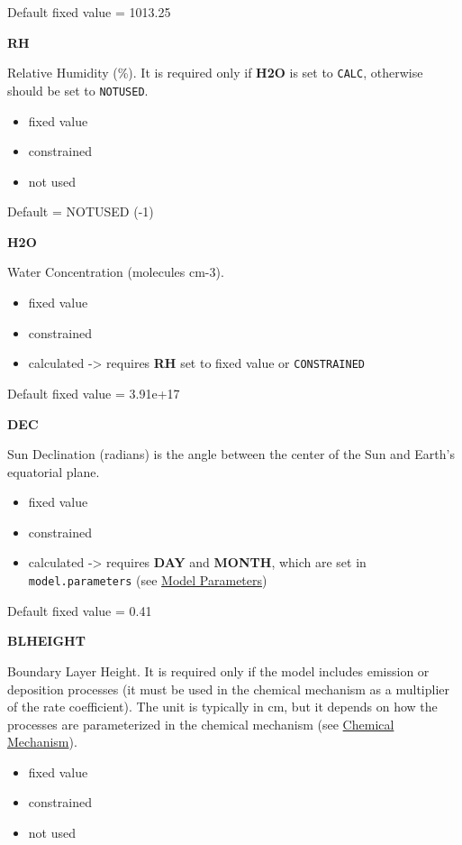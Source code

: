 Default fixed value = 1013.25

\textbf{RH}

Relative Humidity (\%). It is required only if \textbf{H2O} is set to
\texttt{CALC}, otherwise should be set to \texttt{NOTUSED}.

\begin{itemize}
\item fixed value
\item constrained
\item not used
\end{itemize}

Default = NOTUSED (-1)

\textbf{H2O}

Water Concentration (molecules cm-3).

\begin{itemize}
\item fixed value
\item constrained
\item calculated -\textgreater{} requires \textbf{RH} set to fixed
  value or \texttt{CONSTRAINED}
\end{itemize}

Default fixed value = 3.91e+17

\textbf{DEC}

Sun Declination (radians) is the angle between the center of the Sun
and Earth's equatorial plane.

\begin{itemize}
\item fixed value
\item constrained
\item calculated -\textgreater{} requires \textbf{DAY} and
  \textbf{MONTH}, which are set in \texttt{model.parameters} (see
  \hyperref[sec:parameters]{Model Parameters})
\end{itemize}

Default fixed value = 0.41

\textbf{BLHEIGHT}

Boundary Layer Height. It is required only if the model includes
emission or deposition processes (it must be used in the chemical
mechanism as a multiplier of the rate coefficient). The unit is
typically in cm, but it depends on how the processes are parameterized
in the chemical mechanism (see \hyperref[sec:mechanism]{Chemical
  Mechanism}).

\begin{itemize}
\item fixed value
\item constrained
\item not used
\end{itemize}


